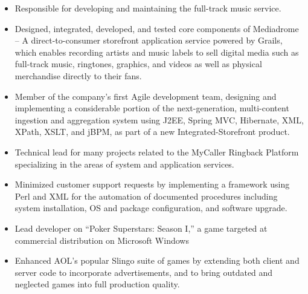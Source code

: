 \documentclass[11pt,letterpaper,roman]{moderncv} %
\begin{document}
{
\begin{itemize}
\item Responsible for developing and maintaining the full-track music service.
\item Designed, integrated, developed, and tested core components of Mediadrome -- A direct-to-consumer storefront application service powered by Grails, which enables recording artists and music labels to sell digital media such as full-track music, ringtones, graphics, and videos as well as physical merchandise directly to their fans.
\item Member of the company's first Agile development team, designing and implementing a considerable portion of the next-generation, multi-content ingestion and aggregation system using J2EE, Spring MVC, Hibernate, XML, XPath, XSLT, and jBPM, as part of a new Integrated-Storefront product. 
\end{itemize}
}

{
\begin{itemize}
\item Technical lead for many projects related to the MyCaller Ringback Platform specializing in the areas of system and application services.
\item Minimized customer support requests by implementing a framework using Perl and XML for the automation of documented procedures including system installation, OS and package configuration, and software upgrade.
\end{itemize}
}

{
\begin{itemize}
\item Lead developer on ``Poker Superstars: Season I,'' a game targeted at commercial distribution on Microsoft Windows
\item Enhanced AOL's popular Slingo suite of games by extending both client and server code to incorporate advertisements, and to bring outdated and neglected games into full production quality.
\end{itemize}
}
\end{document}
